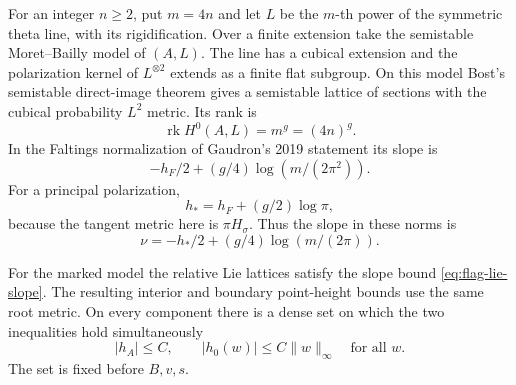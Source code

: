 For an integer \(n\ge2\), put \(m=4n\) and let \(L\) be the
\(m\)-th power of the symmetric theta line, with its rigidification.
Over a finite extension take the semistable Moret--Bailly model
of \((A,L)\). The line has a cubical extension and the polarization
kernel of \(L^{\otimes 2}\) extends as a finite flat subgroup.
On this model Bost's semistable direct-image theorem gives a semistable lattice of sections with the cubical probability \(L^2\) metric. Its rank is 
\[
 \operatorname{rk}H^0(A,L)=m^g=(4n)^g.
\]
 In the Faltings normalization
of Gaudron's 2019 statement its slope is
\[
 -h_F/2+(g/4)\log(m/(2\pi^2)).
\]
For a principal polarization,
\[
 h_* = h_F+(g/2)\log\pi,
\]
because the tangent metric here is
\(\pi H_\sigma\). Thus the slope in these norms is
\[
 \nu=-h_*/2+(g/4)\log(m/(2\pi)).
\]

\cite{bost-mb-flag}\label{cor:flag-point-heights-1}

\begin{proposition}
\label{prop:selected-flag-point-heights}
For the marked model the relative Lie lattices satisfy the
slope bound \eqref{eq:flag-lie-slope}. The resulting interior
and boundary point-height bounds use the same root metric.
On every component there is a dense set on which the two inequalities hold simultaneously
\[
 |h_A|\le C,\qquad |h_0(w)|\le C\|w\|_\infty\quad\text{for all }w.
\]
 The set is fixed before
\(B,v,s\).
\end{proposition}

